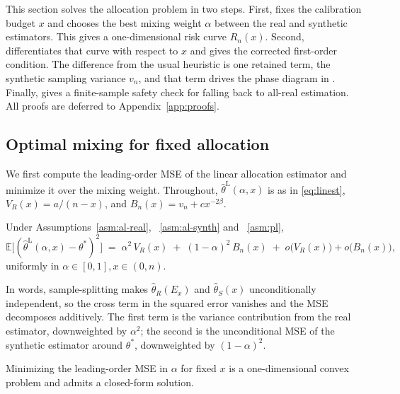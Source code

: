 \label{sec:mixing}

This section solves the allocation problem in two steps. First,  fixes the calibration budget $x$ and chooses the best mixing weight $\alpha$ between the real and synthetic estimators. This gives a one-dimensional risk curve $R_n(x)$. Second,  differentiates that curve with respect to $x$ and gives the corrected first-order condition. The difference from the usual heuristic is one retained term, the synthetic sampling variance $v_n$, and that term drives the phase diagram in . Finally,  gives a finite-sample safety check for falling back to all-real estimation. All proofs are deferred to Appendix~\ref{app:proofs}.

\subsection{Optimal mixing for fixed allocation}\label{ssec:mixing}

We first compute the leading-order MSE of the linear allocation estimator and minimize it over the mixing weight. Throughout, $\hat\theta^{\mathrm{L}}(\alpha,x)$ is as in \cref{eq:linest}, $V_R(x)=a/(n-x)$, and $B_n(x)=v_n+cx^{-2\beta}$.

\begin{lemma}\label{lem:mse-decomp}
  Under Assumptions~\ref{asm:al-real}, ~\ref{asm:al-synth} and ~\ref{asm:pl},
  \begin{equation*}
    \mathbb{E}\bigl[(\hat\theta^{\mathrm{L}}(\alpha,x)-\theta^*)^2\bigr]
    \;=\;\alpha^2\,V_R(x)\;+\;(1-\alpha)^2\,B_n(x)\;+\;o\bigl(V_R(x)\bigr)+o\bigl(B_n(x)\bigr),
  \end{equation*}
  uniformly in $\alpha\in[0,1], x\in (0,n)$.
\end{lemma}

In words, sample-splitting makes $\hat\theta_R(E_x)$ and $\hat\theta_S(x)$ unconditionally independent, so the cross term in the squared error vanishes and the MSE decomposes additively. The first term is the variance contribution from the real estimator, downweighted by $\alpha^2$; the second is the unconditional MSE of the synthetic estimator around $\theta^*$, downweighted by $(1-\alpha)^2$.

Minimizing the leading-order MSE in $\alpha$ for fixed $x$ is a one-dimensional convex problem and admits a closed-form solution.

